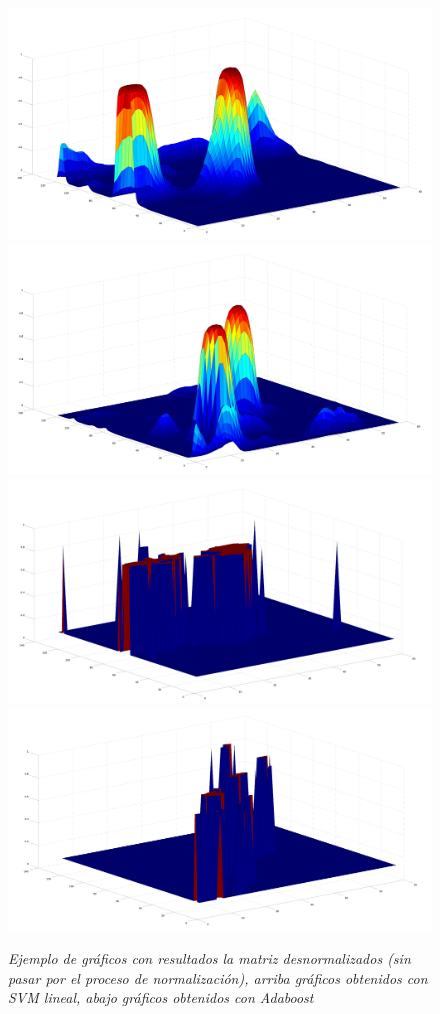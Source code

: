 \begin{figure}[htc]
  \centering
  \includegraphics[scale=.1]{images/sig/1}
  \includegraphics[scale=.1]{images/sig/2}
  \includegraphics[scale=.1]{images/sig/3}
  \includegraphics[scale=.1]{images/sig/4}
  \caption{\em Ejemplo de gráficos con resultados la matriz desnormalizados (sin pasar por el proceso de normalización), arriba gráficos obtenidos con SVM lineal, abajo gráficos obtenidos con Adaboost}  
  \label{fig:sigex}
\end{figure}


